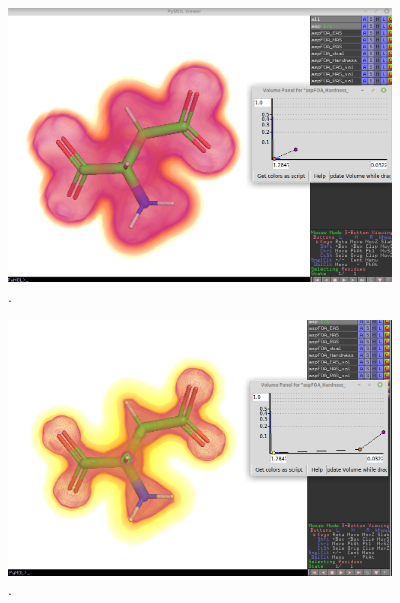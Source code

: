 \documentclass[a4paper,11pt]{refart}
\begin{document}
\hspace*{-\leftmarginwidth}
\begin{minipage}{\fullwidth}
	\begin{figure}[H]
		\begin{center}
			\includegraphics[width=4in]{images/tut4_img13}
			\caption{.}
			\label{fig_tut4_11}
		\end{center}
	\end{figure}
\end{minipage}

\hspace*{-\leftmarginwidth}
\begin{minipage}{\fullwidth}
	\begin{figure}[H]
		\begin{center}
			\includegraphics[width=4in]{images/tut4_img14}
			\caption{.}
			\label{fig_tut4_12}
		\end{center}
	\end{figure}
\end{minipage}
\end{document}
